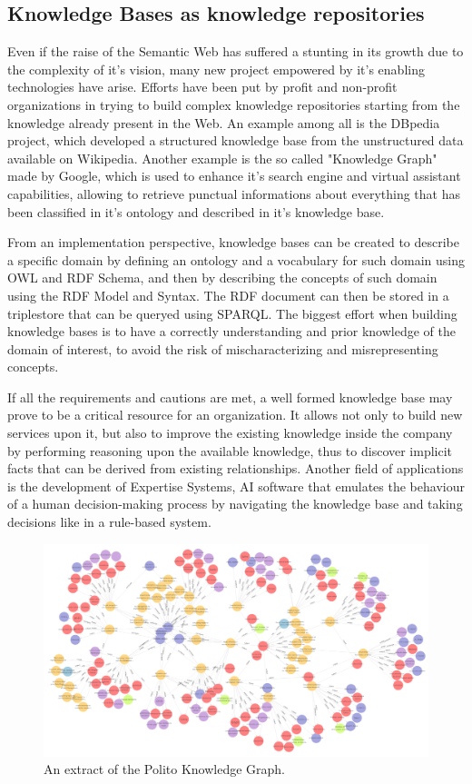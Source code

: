 \documentclass[%
    corpo=13.5pt,
    twoside,
    oldstyle,
    tipotesi=magistrale,
    greek,
    evenboxes
]{toptesi}
\begin{document}
\subsection{Knowledge Bases as knowledge repositories}

Even if the raise of the Semantic Web has suffered a stunting in its growth
due to the complexity of it's vision, many new project empowered by it's
enabling technologies have arise. Efforts have been put by profit and
non-profit organizations in trying to build complex knowledge repositories
starting from the knowledge already present in the Web. An example among all
is the DBpedia project, which developed a structured knowledge base from the
unstructured data available on Wikipedia. Another example is the so called
"Knowledge Graph" made by Google, which is used to enhance it's search engine
and virtual assistant capabilities, allowing to retrieve punctual informations
about everything that has been classified in it's ontology and described
in it's knowledge base.

From an implementation perspective, knowledge bases can be created to
describe a specific domain by defining an ontology and a vocabulary for
such domain using OWL and RDF Schema, and then by describing the concepts
of such domain using the RDF Model and Syntax. The RDF document can then be
stored in a triplestore that can be queryed using SPARQL. The biggest effort
when building knowledge bases is to have a correctly understanding and prior
knowledge of the domain of interest, to avoid the risk of mischaracterizing
and misrepresenting concepts.

If all the requirements and cautions are met, a well formed knowledge base may
prove to be a critical resource for an organization. It allows not only to
build new services upon it, but also to improve the existing knowledge inside the
company by performing reasoning upon the available knowledge, thus
to discover implicit facts that can be derived from existing relationships.
Another field of applications is the development of Expertise Systems, AI software
that emulates the behaviour of a human decision-making process by
navigating the knowledge base and taking decisions like in a rule-based system.


\begin{figure}[h]
\centering
\includegraphics[scale=0.4]{img/geranium-knowledge-base-example.png}
\caption{An extract of the Polito Knowledge Graph.}
\label{fig:geranium-knowledge-base-example} %
\end{figure}
\end{document}
